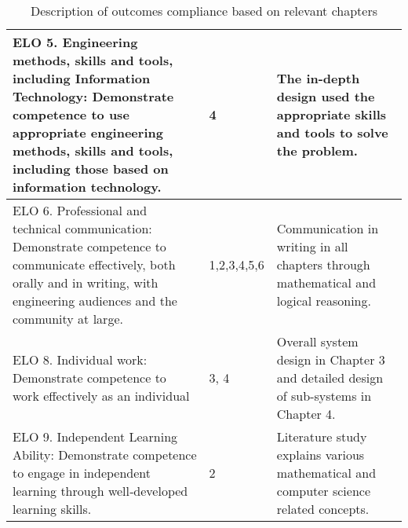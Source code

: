 \begin{table}[H]
\begin{center}
\begin{tabular}{ | p{8cm} | l | p{6cm} |}
    ELO 5. Engineering methods, skills and tools, including Information Technology: Demonstrate competence to use appropriate engineering methods, skills and tools, including those based on information technology. & 4 & The in-depth design used the appropriate skills and tools to solve the problem. \\  \hline



	ELO 6. Professional and technical communication: Demonstrate competence to communicate effectively, both orally and in writing, with engineering audiences and the community at large. & 1,2,3,4,5,6 &  Communication in writing in all chapters through mathematical and logical reasoning.\\  \hline




    ELO 8. Individual work: Demonstrate competence to work effectively as an individual & 3, 4 & Overall system design in Chapter 3 and detailed design of sub-systems in Chapter 4. \\  \hline



    ELO 9. Independent Learning Ability: Demonstrate competence to engage in independent learning through well‐developed learning skills. & 2 &  Literature study explains various mathematical and computer science related concepts.\\  \hline

    \hline
    \end{tabular}
\end{center}
  \caption{ Description of outcomes compliance based on relevant chapters}
    \label{tab:tableb1}
\end{table}